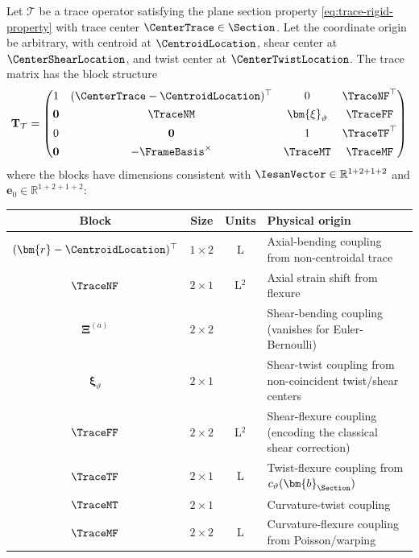 \begin{proposition}
Let $\mathcal{T}$ be a trace operator satisfying the plane section property 
\eqref{eq:trace-rigid-property} with trace center $\CenterTrace \in \Section$. 
Let the coordinate origin be arbitrary, with centroid at $\CentroidLocation$, 
shear center at $\CenterShearLocation$, and twist center at $\CenterTwistLocation$. 
The trace matrix has the block structure
\begin{equation}
\mathbf{T}_{\mathcal{T}} = \begin{pmatrix}
1 & (\CenterTrace - \CentroidLocation)^\top & 0 & \TraceNF^\top \\[4pt]
\mathbf{0} & \TraceNM & \bm{\xi}_{\vartheta} & \TraceFF \\[4pt]
0 & \mathbf{0} %
& 1 & \TraceTF^\top \\[4pt]
\mathbf{0} & -\FrameBasis^{\times} %
& \TraceMT & \TraceMF
\end{pmatrix}
\end{equation}
where the blocks have dimensions consistent with 
$\IesanVector \in \mathbb{R}^{1+2+1+2}$ and $\bm{e}_0 \in \mathbb{R}^{1+2+1+2}$:

\begin{center}
\renewcommand{\arraystretch}{1.3}
\begin{tabular}{c|c|c|l}
Block & Size & Units & Physical origin \\ \hline
$(\bm{r} - \CentroidLocation)^\top$ & $1 \times 2$ & L &
Axial-bending coupling from non-centroidal trace \\
$\TraceNF$ & $2 \times 1$ & L$^{2}$ &
Axial strain shift from flexure \\
$\bm{\Xi}^{(a)}$ & $2 \times 2$ & &
Shear-bending coupling (vanishes for Euler-Bernoulli) \\
$\bm{\xi}_{\vartheta}$ & $2 \times 1$ & &
Shear-twist coupling from non-coincident twist/shear centers \\
$\TraceFF$ & $2 \times 2$ & L$^2$ &
Shear-flexure coupling (encoding the classical shear correction) \\
$\TraceTF$ & $2 \times 1$ & L &
Twist-flexure coupling from $c_\vartheta(\bm{b}_{\Section})$ \\
$\TraceMT$ & $2 \times 1$ & &
Curvature-twist coupling \\
$\TraceMF$ & $2 \times 2$ & L &
Curvature-flexure coupling from Poisson/warping
\end{tabular}
\end{center}
\end{proposition}

